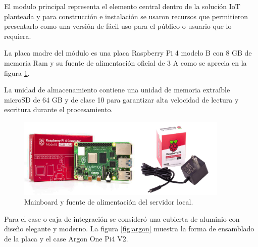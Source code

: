 El modulo principal representa el elemento central dentro de la solución IoT planteada y para construcción e instalación se usaron recursos que permitieron presentarlo como una versión de fácil uso para el público o usuario que lo requiera.

La placa madre del módulo es una placa Raspberry Pi 4 modelo B con 8 GB de memoria Ram y su fuente de alimentación oficial de 3 A como se aprecia en la figura \ref{fig:placarpi4}.

La unidad de almacenamiento contiene una unidad de memoria extraíble microSD de 64 GB y de clase 10 para garantizar alta velocidad de lectura y escritura durante el procesamiento.

\begin{figure}[htpb]
\centering 
\includegraphics[width=0.9\textwidth]{./Figures/placa.png}
\caption{Mainboard y fuente de alimentación del servidor local.}
\label{fig:placarpi4}
\end{figure}




Para el case o caja de integración se consideró una cubierta de aluminio con diseño elegante y moderno. La figura \ref{fig:argon} muestra la forma de ensamblado de la placa y el case Argon One Pi4 V2.


